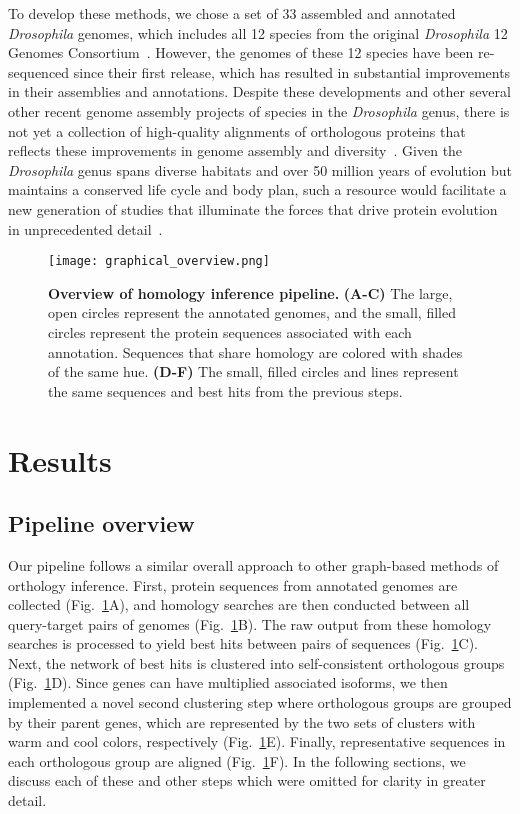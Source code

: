 \documentclass[10pt,letterpaper]{article}
\begin{document}
To develop these methods, we chose a set of 33 assembled and annotated \textit{Drosophila} genomes, which includes all 12 species from the original \textit{Drosophila} 12 Genomes Consortium~\cite{D12GC2007}. However, the genomes of these 12 species have been re-sequenced since their first release, which has resulted in substantial improvements in their assemblies and annotations. Despite these developments and other several other recent genome assembly projects of species in the \textit{Drosophila} genus, there is not yet a collection of high-quality alignments of orthologous proteins that reflects these improvements in genome assembly and diversity~\cite{Miller2018, Kim2021}. Given the \textit{Drosophila} genus spans diverse habitats and over 50 million years of evolution but maintains a conserved life cycle and body plan, such a resource would facilitate a new generation of studies that illuminate the forces that drive protein evolution in unprecedented detail~\cite{Wiegmann2011, Obbard2012}.

\begin{figure}[h!]
\texttt{[image: graphical\_overview.png]}
\centering
\caption{\textbf{Overview of homology inference pipeline.}
\textbf{(A-C)} The large, open circles represent the annotated genomes, and the small, filled circles represent the protein sequences associated with each annotation. Sequences that share homology are colored with shades of the same hue. \textbf{(D-F)} The small, filled circles and lines represent the same sequences and best hits from the previous steps.}
\label{fig:graphical_overview}
\end{figure}

\section*{Results}
\subsection*{Pipeline overview}
Our pipeline follows a similar overall approach to other graph-based methods of orthology inference. First, protein sequences from annotated genomes are collected (Fig.~\ref{fig:graphical_overview}A), and homology searches are then conducted between all query-target pairs of genomes (Fig.~\ref{fig:graphical_overview}B). The raw output from these homology searches is processed to yield best hits between pairs of sequences (Fig.~\ref{fig:graphical_overview}C). Next, the network of best hits is clustered into self-consistent orthologous groups (Fig.~\ref{fig:graphical_overview}D). Since genes can have multiplied associated isoforms, we then implemented a novel second clustering step where orthologous groups are grouped by their parent genes, which are represented by the two sets of clusters with warm and cool colors, respectively (Fig.~\ref{fig:graphical_overview}E). Finally, representative sequences in each orthologous group are aligned (Fig.~\ref{fig:graphical_overview}F). In the following sections, we discuss each of these and other steps which were omitted for clarity in greater detail.
\end{document}
